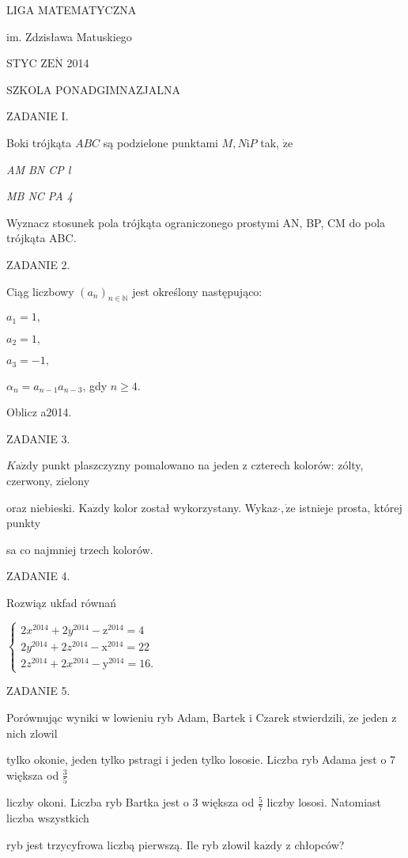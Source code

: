 \documentclass[a4paper,12pt]{article}
\begin{document}
LIGA MATEMATYCZNA

im. Zdzisława Matuskiego

STYC Z$\mathrm{E}\acute{\mathrm{N}}$ 2014

SZKOLA PONADGIMNAZJALNA

ZADANIE I.

Boki trójkąta $ABC$ są podzielone punktami $M, N\mathrm{i}P$ tak, $\dot{\mathrm{z}}\mathrm{e}$

{\it AM BN CP l}

{\it MB NC PA 4}

Wyznacz stosunek pola trójkąta ograniczonego prostymi AN, BP, CM do pola trójkąta ABC.

ZADANIE 2.

Ciąg liczbowy $(a_{n})_{n\in \mathbb{N}}$ jest określony następująco:

$a_{1}=1,$

$a_{2}=1,$

$a_{3}=-1,$

$\alpha_{n}=a_{n-1}a_{n-3}$, gdy $n\geq 4.$

Oblicz a2014.

ZADANIE 3.

$K\mathrm{a}\dot{\mathrm{z}}\mathrm{d}\mathrm{y}$ punkt plaszczyzny pomalowano na jeden z czterech kolorów: zólty, czerwony, zielony

oraz niebieski. $\mathrm{K}\mathrm{a}\dot{\mathrm{z}}\mathrm{d}\mathrm{y}$ kolor został wykorzystany. Wykaz$\cdot, \dot{\mathrm{z}}\mathrm{e}$ istnieje prosta, której punkty

sa co najmniej trzech kolorów.

ZADANIE 4.

Rozwiąz ukfad równań

$\left\{\begin{array}{l}
2x^{2014}+2y^{2014}-\mathrm{z}^{2014}=4\\
2y^{2014}+2z^{2014}-\mathrm{x}^{2014}=22\\
2z^{2014}+2x^{2014}-\mathrm{y}^{2014}=16.
\end{array}\right.$

ZADANIE 5.

Porównując wyniki w lowieniu ryb Adam, Bartek i Czarek stwierdzili, $\dot{\mathrm{z}}\mathrm{e}$ jeden z nich zlowil

tylko okonie, jeden tylko pstragi i jeden tylko lososie. Liczba ryb Adama jest o 7 większa od $\displaystyle \frac{3}{5}$

liczby okoni. Liczba ryb Bartka jest o 3 większa od $\displaystyle \frac{5}{7}$ liczby lososi. Natomiast liczba wszystkich

ryb jest trzycyfrowa liczbą pierwszą. Ile ryb złowil $\mathrm{k}\mathrm{a}\dot{\mathrm{z}}\mathrm{d}\mathrm{y}$ z chłopców?
\end{document}
